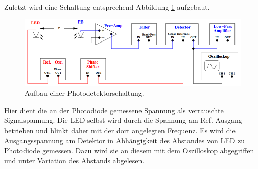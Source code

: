 Zuletzt wird eine Schaltung entsprechend Abbildung \ref{fig:Schaltung2} aufgebaut.
\begin{figure}[H]
  \centering
  \includegraphics[width=14cm]{Schaltung2.PNG}
  \caption{Aufbau einer Photodetektorschaltung. \cite{sample}}
  \label{fig:Schaltung2}
\end{figure}
Hier dient die an der Photodiode gemessene Spannung als verrauschte Signalspannung.
Die LED selbst wird durch die Spannung am Ref. Ausgang betrieben und blinkt daher
mit der dort angelegten Frequenz.
Es wird die Ausgangsspannung am Detektor in Abhängigkeit des Abstandes von LED zu Photodiode
gemessen. Dazu wird sie an diesem mit dem Oszilloskop abgegriffen und unter Variation des
Abstands abgelesen.
